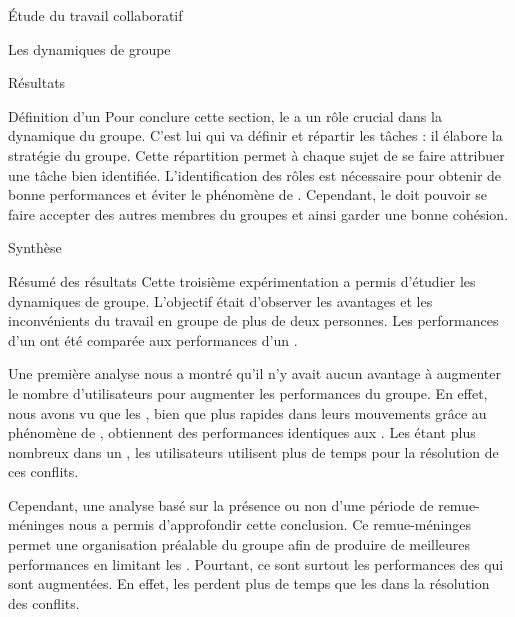 \documentclass[myfrancais]{mythesis}
\begin{document}
\begin{mypart}{Étude du travail collaboratif}
\begin{mychapter}{Les dynamiques de groupe}
\begin{mysection}{Résultats}
\begin{mysubsection}{Définition d'un }
					Pour conclure cette section, le  a un rôle crucial dans la dynamique du groupe.
					C'est lui qui va définir et répartir les tâches : il élabore la stratégie du groupe.
					Cette répartition permet à chaque sujet de se faire attribuer une tâche bien identifiée.
					L'identification des rôles est nécessaire pour obtenir de bonne performances et éviter le phénomène de  .
					Cependant, le  doit pouvoir se faire accepter des autres membres du groupes et ainsi garder une bonne cohésion.
				\end{mysubsection}
			\end{mysection}
			\begin{mysection}{Synthèse}
				\begin{mysubsection}{Résumé des résultats}
					Cette troisième expérimentation a permis d'étudier les dynamiques de groupe.
					L'objectif était d'observer les avantages et les inconvénients du travail en groupe de plus de deux personnes.
					Les performances d'un  ont été comparée aux performances d'un .

					Une première analyse nous a montré qu'il n'y avait aucun avantage à augmenter le nombre d'utilisateurs pour augmenter les performances du groupe.
					En effet, nous avons vu que les , bien que plus rapides dans leurs mouvements grâce au phénomène de , obtiennent des performances identiques aux .
					Les  étant plus nombreux dans un , les utilisateurs utilisent plus de temps pour la résolution de ces conflits.

					Cependant, une analyse basé sur la présence ou non d'une période de remue-méninges nous a permis d'approfondir cette conclusion.
					Ce remue-méninges permet une organisation préalable du groupe afin de produire de meilleures performances en limitant les .
					Pourtant, ce sont surtout les performances des  qui sont augmentées.
					En effet, les  perdent plus de temps que les  dans la résolution des conflits.


\end{mysubsection}
\end{mysection}
\end{mychapter}
\end{mypart}
\end{document}
